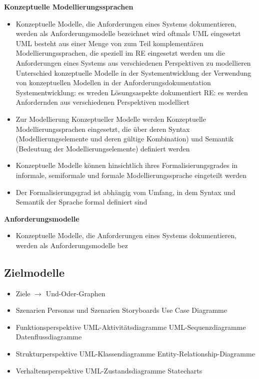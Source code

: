 \documentclass{report}
\theoremstyle{definition}
\theoremstyle{example}
\begin{document}
\textbf{Konzeptuelle Modellierungssprachen}
\begin{itemize}
   \item Konzeptuelle Modelle, die Anforderungen eines Systems dokumentieren, werden als Anforderungsmodelle bezeichnet
   \subitem wird oftmals UML eingesetzt
   \subitem UML besteht aus einer Menge von zum Teil komplementären Modellierungssprachen, die speziell im RE eingesetzt werden um die Anforderungen eines Systems aus verschiedenen Perspektiven zu modellieren
   \subitem Unterschied konzeptuelle Modelle in der Systementwicklung der Verwendung von konzeptuellen Modellen in der Anforderungsdokumentation
   \subsubitem Systementwicklung: es wreden Lösungsaspekte dokumentiert
   \subsubitem RE: es werden Anfordernden aus verschiedenen Perspektiven modelliert
   \item Zur Modellierung Konzeptueller Modelle werden Konzeptuelle Modellierungssprachen eingesetzt, die über deren Syntax (Modellierungselemente und deren gültige Kombination) und Semantik (Bedeutung der Modellierungselemente) definiert werden
   \item Konzeptuelle Modelle können hinsichtlich ihres Formalisierungsgrades in informale, semiformale und formale Modellierungssprache eingeteilt werden
   \item Der Formalisierungsgrad ist abhängig vom Umfang, in dem Syntax und Semantik der Sprache formal definiert sind
\end{itemize}

\textbf{Anforderungsmodelle}
\begin{itemize}
   \item Konzeptuelle Modelle, die Anforderungen eines Systems dokumentieren, werden als Anforderungsmodelle bez
\end{itemize}

\subsection{Zielmodelle}
\begin{itemize}
   \item Ziele $\rightarrow$ Und-Oder-Graphen
   \item Szenarien
   \subitem Personas und Szenarien
   \subitem Storyboards
   \subitem Use Case Diagramme
   \item Funktionsperspektive
   \subitem UML-Aktivitätsdiagramme
   \subitem UML-Sequenzdiagramme
   \subitem Datenflussdiagramme 
   \item Strukturperspektive
   \subitem UML-Klassendiagramme
   \subitem Entity-Relationship-Diagramme 
   \item Verhaltensperspektive
   \subitem UML-Zustandsdiagramme
   \subitem Statecharts
\end{itemize}
\end{document}
